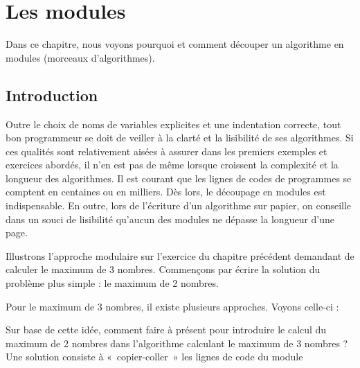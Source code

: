 \chapter{Les modules}

	Dans ce chapitre, nous voyons pourquoi et comment découper un algorithme
	en modules (morceaux d'algorithmes).

\section{Introduction}

	Outre le choix de noms de variables explicites et une indentation
	correcte, tout bon programmeur se doit de veiller à la clarté et la
	lisibilité de ses algorithmes. Si ces qualités sont relativement aisées
	à assurer dans les premiers exemples et exercices abordés, il n’en est
	pas de même lorsque croissent la complexité et la longueur des
	algorithmes. Il est courant que les lignes de codes de programmes se
	comptent en centaines ou en milliers. Dès lors, le découpage en modules
	est indispensable. En outre, lors de l’écriture d’un algorithme sur
	papier, on conseille dans un souci de lisibilité qu’aucun des modules
	ne dépasse la longueur d’une page.
	
	Illustrons l’approche modulaire sur l’exercice du chapitre précédent
	demandant de calculer le maximum de 3 nombres. Commençons par écrire la
	solution du problème plus simple : le maximum de 2 nombres.

	
	Pour le maximum de 3 nombres, il existe plusieurs approches. Voyons
	celle-ci :


	{Sur base de cette idée, comment faire à présent
	pour introduire le calcul du maximum de 2 nombres dans l’algorithme
	calculant le maximum de 3 nombres ? Une solution consiste à
	«~copier-coller~» les lignes de code du module
	}

